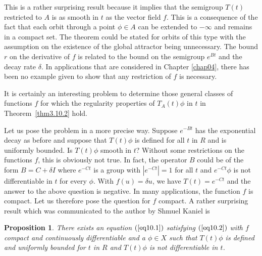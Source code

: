 \documentclass{surv-l}
\theoremstyle{plain}
\newtheorem{proposition}[theorem]{Proposition}
\theoremstyle{definition}
\numberwithin{equation}{section}
\numberwithin{figure}{chapter}
\begin{document}
This is a rather surprising result because it implies that the semigroup $T(t)$ restricted to $A$ is as smooth in $t$ as the vector field $f$. This is a consequence of the fact that each orbit through a point $\phi \in A$ can be extended to $-\infty$ and remains in a compact set. The theorem could be stated for orbits of this type with the assumption on the existence of the global attractor being unnecessary. The bound $r$ on the derivative of $f$ is related to the bound on the semigroup $e^{Bt}$ and the decay rate $\delta$. In applications that are considered in Chapter \ref{chap04}, there has been no example given to show that any restriction of $f$ is necessary.

It is certainly an interesting problem to determine those general classes of functions $f$ for which the regularity properties of $T_{A}(t)\phi$ in $t$ in Theorem~\ref{thm3.10.2} hold.

Let us pose the problem in a more precise way. Suppose $e^{-Bt}$ has the exponential decay as before and suppose that $T(t)\phi$ is defined for all $t$ in $R$ and is uniformly bounded. Is $ T(t)\phi$ smooth in $t$? Without some restrictions on the functions $f$, this is obviously not true. In fact, the operator $B$ could be of the form $B=C+\delta I$ where $e^{-Ct}$ is a group with $|e^{-Ct}|=1$ for all $t$ and $ e^{-Ct}\phi$ is not differentiable in $t$ for every $\phi$. With $f(u)= \delta u$, we have $T(t)=e^{-Ct}$ and the answer to the above question is negative. In many applications, the function $f$ is compact. Let us therefore pose the question for $f$ compact. A rather surprising result which was communicated to the author by Shmuel Kaniel is

\begin{proposition}\label{pro3.10.3} There exists an equation $(\ref{eq10.1})$ satisfying $(\ref{eq10.2})$ with $f$ compact and continuously differentiable and a $\phi \in X$ such that $ T(t)\phi$ is defined and uniformly bounded for $t$ in $R$ and $ T(t)\phi$ is not differentiable in $t$.
\end{proposition}
\end{document}

